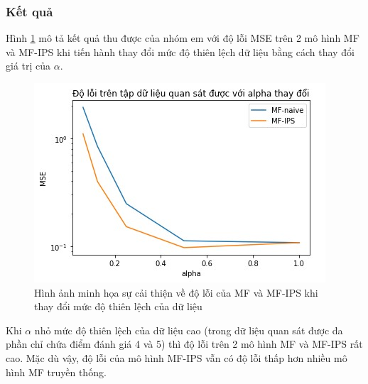 \subsubsection{Kết quả}
Hình \ref{fig:4_movielens} mô tả kết quả thu được của nhóm em với độ lỗi MSE trên 2 mô hình MF và MF-IPS khi tiến hành thay đổi mức độ thiên lệch dữ liệu bằng cách thay đổi giá trị của $\alpha$.
\begin{figure}[h]
    \centering
    \includegraphics{images/Chapter4/movielens.jpg}
    \caption{Hình ảnh minh họa sự cải thiện về độ lỗi của MF và MF-IPS khi thay đổi mức độ thiên lệch của dữ liệu}
    \label{fig:4_movielens}
\end{figure}

Khi $\alpha$ nhỏ mức độ thiên lệch của dữ liệu cao (trong dữ liệu quan sát được đa phần chỉ chứa điểm đánh giá 4 và 5) thì độ lỗi trên 2 mô hình MF và MF-IPS rất cao. Mặc dù vậy, độ lỗi của mô hình MF-IPS vẫn có độ lỗi thấp hơn nhiều mô hình MF truyền thống. 

